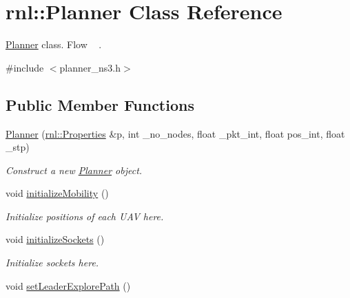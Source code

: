 \hypertarget{classrnl_1_1Planner}{}\section{rnl\+:\+:Planner Class Reference}
\label{classrnl_1_1Planner}


\hyperlink{classrnl_1_1Planner}{Planner} class. Flow ~\newline
.  




{\ttfamily \#include $<$planner\+\_\+ns3.\+h$>$}

\subsection*{Public Member Functions}
\begin{DoxyCompactItemize}
\item 
\hyperlink{classrnl_1_1Planner_ade6389dfdb02265bc6ce2960a25c4dae}{Planner} (\hyperlink{classrnl_1_1Properties}{rnl\+::\+Properties} \&p, int \+\_\+no\+\_\+nodes, float \+\_\+pkt\+\_\+int, float pos\+\_\+int, float \+\_\+stp)
\begin{DoxyCompactList}\small\item\em Construct a new \hyperlink{classrnl_1_1Planner}{Planner} object. \end{DoxyCompactList}\item 
\mbox{\label{classrnl_1_1Planner_a5f8cbd19c1899676274db804f0a1100b}} 
void \hyperlink{classrnl_1_1Planner_a5f8cbd19c1899676274db804f0a1100b}{initialize\+Mobility} ()
\begin{DoxyCompactList}\small\item\em Initialize positions of each U\+AV here. \end{DoxyCompactList}\item 
\mbox{\label{classrnl_1_1Planner_aba6032771a33950141c1d22fc6a580c0}} 
void \hyperlink{classrnl_1_1Planner_aba6032771a33950141c1d22fc6a580c0}{initialize\+Sockets} ()
\begin{DoxyCompactList}\small\item\em Initialize sockets here. \end{DoxyCompactList}\item 
\mbox{\label{classrnl_1_1Planner_a57f5f88febcf596a423f5ec96112d1c2}} 
void \hyperlink{classrnl_1_1Planner_a57f5f88febcf596a423f5ec96112d1c2}{set\+Leader\+Explore\+Path} ()

\end{DoxyCompactItemize}
